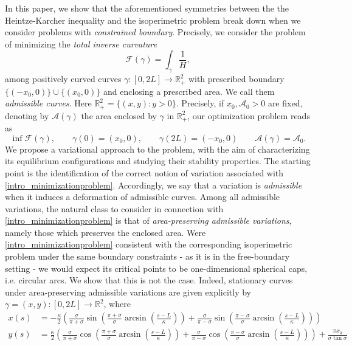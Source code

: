 \documentclass[11pt]{amsart}
\newcommand{\A}{\mathcal A}
\newcommand{\rr}{{\mathbb{R}}}
\renewcommand{\k}{\kappa}
\newcommand{\ga}{\gamma}
\theoremstyle{definition}
\theoremstyle{remark}
\numberwithin{equation}{section}
\begin{document}
	
	In this paper, we show that the aforementioned symmetries between the the Heintze-Karcher inequality and the isoperimetric problem break down when we consider problems with \emph{constrained boundary}.
	Precisely, we consider the problem of minimizing the \emph{total inverse curvature}
	$$
	\mathcal F(\ga)=\int_\gamma\frac{1}{H},
	$$
	among positively curved curves $\ga:[0,2L]\to\rr^2_+$  with prescribed boundary $\{(-x_0,0)\}\cup\{(x_0,0)\}$ and enclosing a prescribed area. We call them \emph{admissible curves}. Here $\rr^2_+=\{(x,y): y>0\}$. Precisely, if $x_0,\A_0>0$ are fixed, denoting by $\A(\gamma)$ the area enclosed by $\gamma$ in $\rr^2_+$, our optimization problem reads as 
	\begin{equation}\label{intro_minimizationproblem}
		\inf\mathcal F(\ga),\qquad\gamma(0)=(x_0,0),\qquad\gamma(2L)=(-x_0,0)\qquad\A(\gamma)=\A_0.
	\end{equation}
	We propose a variational approach to the problem, with the aim of characterizing its equilibrium configurations and studying their stability properties. 
	The starting point is the identification of the correct notion of variation associated with \eqref{intro_minimizationproblem}. Accordingly, we say that a variation is \emph{admissible} when it induces a deformation of admissible curves. Among all admissible variations, the natural class to consider in connection with \eqref{intro_minimizationproblem} is that of \emph{area-preserving admissible variations}, namely those which preserves the enclosed area.
	Were \eqref{intro_minimizationproblem} consistent with the corresponding isoperimetric problem under the same boundary constraints - as it is in the free-boundary setting - we would expect its critical points to be one-dimensional spherical caps, i.e. circular arcs. We show that this is not the case. Indeed, stationary curves under area-preserving admissible variations are given explicitly by $\ga=(x,y):[0,2L]\to\rr^2$, where
	\begin{equation}\label{intro_criticalpoint}
		\begin{split}
			x(s)&=-\frac{\k}{2}\left(\frac{\sigma}{\pi+\sigma}\sin\left(\frac{\pi+\sigma}{\sigma}\arcsin\left(\frac{s-L}{\k}\right)\right)+\frac{\sigma}{\pi-\sigma}\sin\left(\frac{\pi-\sigma}{\sigma}\arcsin\left(\frac{s-L}{\k}\right)\right)\right)\\
			y(s)&=\frac{\k}{2}\left(\frac{\sigma}{\pi+\sigma}\cos\left(\frac{\pi+\sigma}{\sigma}\arcsin\left(\frac{s-L}{\k}\right)\right)+\frac{\sigma}{\pi-\sigma}\cos\left(\frac{\pi-\sigma}{\sigma}\arcsin\left(\frac{s-L}{\k}\right)\right)\right)+\frac{\pi x_0}{\sigma\tan\sigma}
		\end{split}
	\end{equation}
\end{document}
